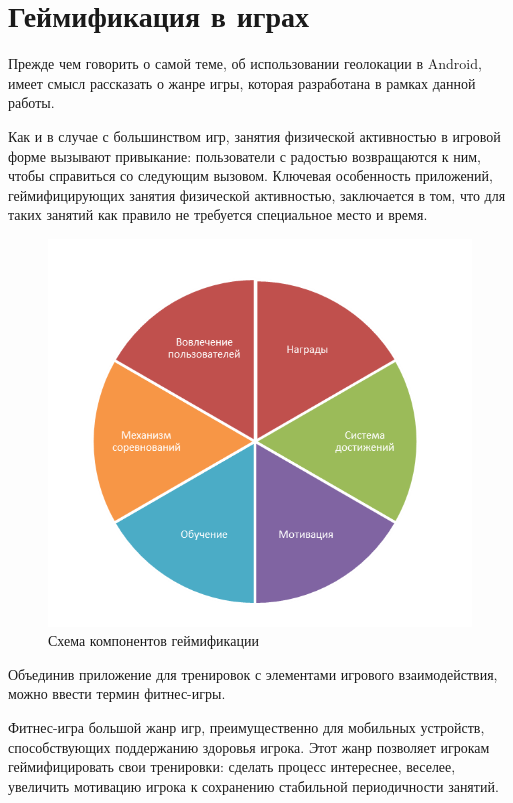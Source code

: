 \chapter{Геймификация в играх}
Прежде чем говорить о самой теме, об использовании геолокации в Android, имеет смысл рассказать о жанре игры, которая разработана в рамках данной работы.

Как и в случае с большинством игр, занятия физической активностью в игровой форме вызывают привыкание: пользователи с радостью возвращаются к ним, чтобы справиться со следующим вызовом.
Ключевая особенность приложений, геймифицирующих занятия физической активностью, заключается в том, что для таких занятий как правило не требуется специальное место и время.

\begin{figure}[H]
	\centering
	\includegraphics{flesh/gamification/gamification_pie.png}
	\caption{\label{fig:gamification_pie}Схема компонентов геймификации}
\end{figure}

Объединив приложение для тренировок с элементами игрового взаимодействия, можно ввести термин фитнес-игры. 

Фитнес-игра \textendash\space большой жанр игр, преимущественно для мобильных устройств, способствующих поддержанию здоровья игрока. Этот жанр позволяет игрокам геймифицировать свои тренировки: сделать процесс интереснее, веселее, увеличить мотивацию игрока к сохранению стабильной периодичности занятий.

